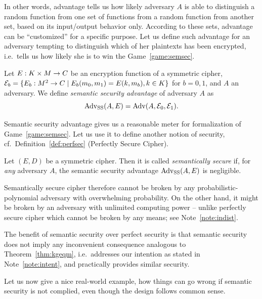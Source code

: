In other words, advantage tells us how likely adversary $A$ is able to distinguish a random function from one set of functions from a random function from another set, based on its input/output behavior only. According to these sets, advantage can be ``customized'' for a specific purpose. Let us define such advantage for an adversary tempting to distinguish which of her plaintexts has been encrypted, i.e.\ tells us how likely she is to win the Game~\ref{game:semsec}.

\begin{defn}
\label{def:ssadvant}
	Let $E: K\times M\rightarrow C$ be an encryption function of a symmetric cipher, ${\cal E}_b = \{E_b:M^2\rightarrow C \mid E_b(m_0,m_1) = E(k,m_b), k\in K\}$ for $b=0,1$, and $A$ an adversary. We define {\em semantic security advantage} of adversary $A$ as
	\[
		\operatorname*{Adv_{SS}}(A,E) = \operatorname*{Adv}(A,{\cal E}_0,{\cal E}_1) .
	\]
\end{defn}

Semantic security advantage gives us a reasonable meter for formalization of Game~\ref{game:semsec}. Let us use it to define another notion of security, cf.\ Definition~\ref{def:perfsec} (Perfectly Secure Cipher).

\begin{defn}
\label{def:semsec}
	Let $(E,D)$ be a symmetric cipher. Then it is called {\em semantically secure} if, for {\em any} adversary $A$, the semantic security advantage $\operatorname*{Adv_{SS}}(A,E)$ is negligible.
\end{defn}

Semantically secure cipher therefore cannot be broken by any probabilistic-polynomial adversary with overwhelming probability. On the other hand, it might be broken by an adversary with unlimited computing power -- unlike perfectly secure cipher which cannot be broken by any means; see Note~\ref{note:indist}.

The benefit of semantic security over perfect security is that semantic security does not imply any inconvenient consequence analogous to Theorem~\ref{thm:kgeqm}, i.e.\ addresses our intention as stated in Note~\ref{note:intent}, and practically provides similar security.

Let us now give a nice real-world example, how things can go wrong if semantic security is not complied, even though the design follows common sense.

